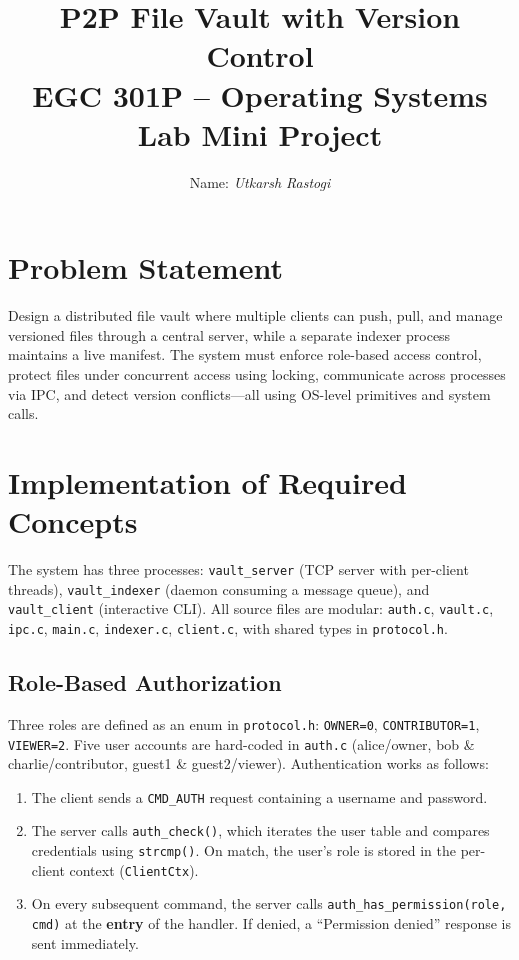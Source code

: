 \documentclass[12pt,a4paper]{article}
\title{\textbf{P2P File Vault with Version Control} \\[0.3cm]
       \large EGC 301P -- Operating Systems Lab Mini Project}
\author{Name: \textit{Utkarsh Rastogi}}\n
\begin{document}
\maketitle

\section{Problem Statement}

Design a distributed file vault where multiple clients can push, pull, and manage
versioned files through a central server, while a separate indexer process maintains
a live manifest. The system must enforce role-based access control, protect files
under concurrent access using locking, communicate across processes via IPC, and
detect version conflicts---all using OS-level primitives and system calls.

\section{Implementation of Required Concepts}

The system has three processes: \texttt{vault\_server} (TCP server with per-client
threads), \texttt{vault\_indexer} (daemon consuming a message queue), and
\texttt{vault\_client} (interactive CLI). All source files are modular:
\texttt{auth.c}, \texttt{vault.c}, \texttt{ipc.c}, \texttt{main.c},
\texttt{indexer.c}, \texttt{client.c}, with shared types in \texttt{protocol.h}.

\subsection{Role-Based Authorization}

Three roles are defined as an enum in \texttt{protocol.h}:
\texttt{OWNER=0}, \texttt{CONTRIBUTOR=1}, \texttt{VIEWER=2}. Five user accounts
are hard-coded in \texttt{auth.c} (alice/owner, bob \& charlie/contributor,
guest1 \& guest2/viewer). Authentication works as follows:

\begin{enumerate}[itemsep=0.3em]
    \item The client sends a \texttt{CMD\_AUTH} request containing a username and password.
    \item The server calls \texttt{auth\_check()}, which iterates the user table and
          compares credentials using \texttt{strcmp()}. On match, the user's role is
          stored in the per-client context (\texttt{ClientCtx}).
    \item On every subsequent command, the server calls
          \texttt{auth\_has\_permission(role, cmd)} at the \textbf{entry} of the handler.
          If denied, a ``Permission denied'' response is sent immediately.
\end{enumerate}
\end{document}
